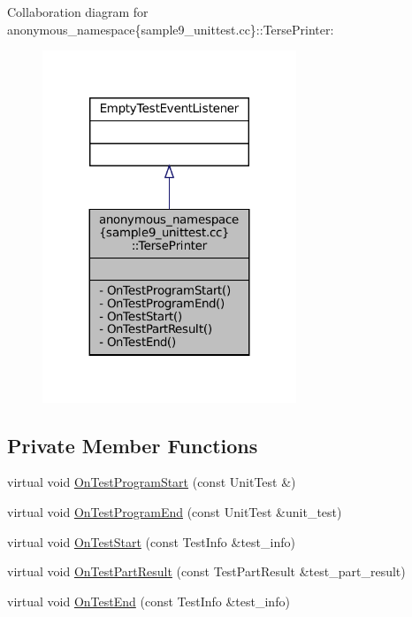 Collaboration diagram for anonymous\+\_\+namespace\{sample9\+\_\+unittest.\+cc\}\+:\+:Terse\+Printer\+:
\nopagebreak
\begin{figure}[H]
\begin{center}
\leavevmode
\includegraphics[width=215pt]{classanonymous__namespace_02sample9__unittest_8cc_03_1_1TersePrinter__coll__graph}
\end{center}
\end{figure}
\subsection*{Private Member Functions}
\begin{DoxyCompactItemize}
\item 
virtual void \hyperlink{classanonymous__namespace_02sample9__unittest_8cc_03_1_1TersePrinter_aa0ee42df8145bcbd9f55498d2bf452f0}{On\+Test\+Program\+Start} (const Unit\+Test \&)
\item 
virtual void \hyperlink{classanonymous__namespace_02sample9__unittest_8cc_03_1_1TersePrinter_a50e73e52170d108cc66e6c3314fcdca9}{On\+Test\+Program\+End} (const Unit\+Test \&unit\+\_\+test)
\item 
virtual void \hyperlink{classanonymous__namespace_02sample9__unittest_8cc_03_1_1TersePrinter_a153fd9fe6e0ebe42bb4bcfddd305c88b}{On\+Test\+Start} (const Test\+Info \&test\+\_\+info)
\item 
virtual void \hyperlink{classanonymous__namespace_02sample9__unittest_8cc_03_1_1TersePrinter_aba95a965e58c0607c3a2d8255a2ab19d}{On\+Test\+Part\+Result} (const Test\+Part\+Result \&test\+\_\+part\+\_\+result)
\item 
virtual void \hyperlink{classanonymous__namespace_02sample9__unittest_8cc_03_1_1TersePrinter_ac82163919fd602714e24654cb1d76b65}{On\+Test\+End} (const Test\+Info \&test\+\_\+info)
\end{DoxyCompactItemize}



